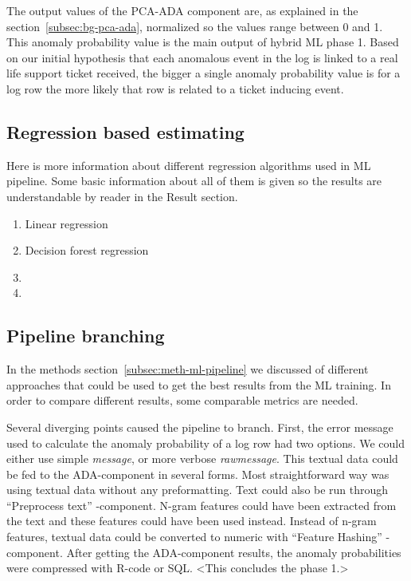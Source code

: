 The output values of the PCA-ADA component are,
as explained in the section~\ref{subsec:bg-pca-ada},
normalized so the values range between 0 and 1.
This anomaly probability value
is the main output of hybrid ML phase 1.
Based on our initial hypothesis
that each anomalous event in the log
is linked to a real life support ticket received,
the bigger a single anomaly probability value is for a log row
the more likely that row is related to a ticket inducing event.




\subsection{Regression based estimating}\label{subsec:pipe-regression-estimating}
\begin{itcomment}
    Here is more information about different regression algorithms
    used in ML pipeline.
    Some basic information about all of them is given so the results are understandable
    by reader in the Result section.
\end{itcomment}

\begin{enumerate}
    \item Linear regression
    \item Decision forest regression
    \item \etc
    \item \etc
\end{enumerate}



\subsection{Pipeline branching}\label{subsec:pipe-branching}

In the methods section~\ref{subsec:meth-ml-pipeline}
we discussed of different approaches that could be used
to get the best results from the ML training.
In order to compare different results,
some comparable metrics are needed.

Several diverging points caused the pipeline to branch.
First,
the error message used to calculate the anomaly probability of a log row
had two options.
We could either use simple \textit{message},
or more verbose \textit{rawmessage}.
This textual data could be fed to the ADA-component in several forms.
Most straightforward way was using textual data without any preformatting.
Text could also be run through \enquote{Preprocess text} -component. %
N-gram features could have been extracted from the text
and these features could have been used instead.
Instead of n-gram features,
textual data could be converted to numeric
with \enquote{Feature Hashing} -component.
After getting the ADA-component results,
the anomaly probabilities were compressed with R-code or SQL. %
<This concludes the phase 1.> %

